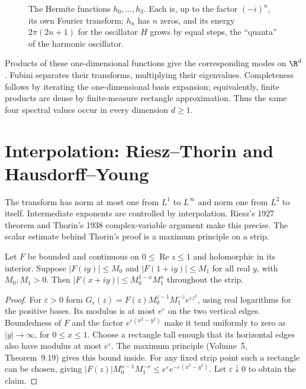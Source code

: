 \begin{figure}[ht]
\centering
{}
\caption{The Hermite functions $h_0,\dots,h_3$. Each is, up to the factor $(-i)^n$, its own Fourier transform; $h_n$ has $n$ zeros, and its energy $2\pi(2n+1)$ for the oscillator $H$ grows by equal
steps, the ``quanta'' of the harmonic oscillator.}
\label{fig:hermite}
\end{figure}

Products of these one-dimensional functions give the corresponding modes on $\R^d$. Fubini separates their transforms, multiplying their eigenvalues. Completeness follows by iterating the one-dimensional basis expansion; equivalently, finite products are dense by finite-measure rectangle approximation. Thus the same four spectral values occur in every dimension $d\ge1$.

\section{Interpolation: Riesz--Thorin and Hausdorff--Young}

The transform has norm at most one from $L^1$ to $L^\infty$ and norm one from $L^2$ to itself. Intermediate exponents are controlled by interpolation. Riesz's 1927 theorem and Thorin's 1938 complex-variable argument make this precise. The scalar estimate behind Thorin's proof is a maximum principle on a strip.

\begin{lemma}\label{lem:threelines}
Let $F$ be bounded and continuous on $0\le\operatorname{Re}z\le1$ and holomorphic in its interior. Suppose $|F(iy)|\le M_0$ and $|F(1+iy)|\le M_1$ for all real $y$, with $M_0,M_1>0$. Then
$|F(x+iy)|\le M_0^{1-x}M_1^x$ throughout the strip.
\end{lemma}
\begin{proof}
For $\varepsilon>0$ form
$G_\varepsilon(z)=F(z)M_0^{z-1}M_1^{-z}e^{\varepsilon z^2}$,
using real logarithms for the positive bases. Its modulus is at most $e^\varepsilon$ on the two vertical edges. Boundedness of $F$ and the factor $e^{\varepsilon(x^2-y^2)}$ make it tend uniformly to zero as $|y|\to\infty$, for $0\le x\le1$. Choose a rectangle tall enough that its horizontal edges also have modulus at most $e^\varepsilon$. The maximum principle (Volume~5, Theorem~9.19) gives this bound inside. For any fixed strip point such a rectangle can be chosen, giving
$|F(z)|M_0^{x-1}M_1^{-x}\le e^\varepsilon e^{-\varepsilon(x^2-y^2)}$.
Let $\varepsilon\downarrow0$ to obtain the claim.
\end{proof}

